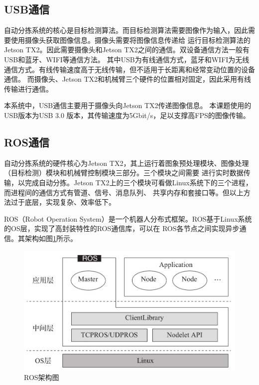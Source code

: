 \subsection{USB通信}

自动分拣系统的核心是目标检测算法。而目标检测算法需要图像作为输入，因此需要使用摄像头获取图像信息。摄像头需要将图像信息传递给
运行目标检测算法的Jetson TX2。因此需要摄像头和Jetson TX2之间的通信。双设备通信方法一般有USB和蓝牙、WIFI等通信方法。
其中USB为有线通信方式，蓝牙和WIFI为无线通信方式。有线传输速度高于无线传输，但不适用于长距离和经常变动位置的设备通信。
而摄像头、Jetson TX2和机械臂三个硬件的位置相对固定，因此采用有线传输进行通信。

本系统中，USB通信主要用于摄像头向Jetson TX2传递图像信息。
本课题使用的USB版本为USB 3.0    \cite{USB3.0}版本，其传输速度为5Gbit/s，足以支撑高FPS的图像传输。

\subsection{ROS通信}

自动分拣系统的硬件核心为Jetson TX2，其上运行着图象预处理模块、图像处理（目标检测）模块和机械臂控制模块三部分。三个模块之间需要
进行实时数据传输，以完成自动分拣。Jetson TX2上的三个模块可看做Linux系统下的三个进程，而进程间的通信方式有管道、信号、消息队列、
共享内存和套接口等。\cite{jincheng_comm}但以上方法过于底层，实现复杂、效率低下。

ROS（Robot Operation System）\cite{ROS}是一个机器人分布式框架。ROS基于Linux系统的OS层，实现了高封装特性的ROS通信库，可以在
ROS各节点之间实现异步通信。其架构如图\ref{fig:ROS_construct}所示\cite{ROS_book}。

\begin{figure}[h]
    \centering
    \includegraphics[width=\textwidth]{pic/chap2/ROS_construct.jpg}
    \caption{ROS架构图}
    \label{fig:ROS_construct}
\end{figure}

